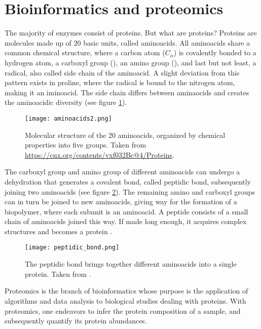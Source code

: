 \section{Bioinformatics and proteomics}

The majority of enzymes consist of proteins. But what are proteins? Proteins are molecules made up of 20 basic units, called aminoacids. All aminoacids share a common chemical structure, where a carbon atom ($C_\alpha$) is covalently bonded to a hydrogen atom, a carboxyl group (), an amino group (), and last but not least, a radical, also called side chain of the aminoacid. A slight deviation from this pattern exists in proline, where the radical is bound to the nitrogen atom, making it an iminoacid. The side chain differs between aminaocids and creates the aminoacidic diversity   (see figure \ref{fig:aminoacids}).

\begin{figure}
  \centering
  \texttt{[image: aminoacids2.png]}
  \caption[The 20 aminoacids]{Molecular structure of the 20 aminoacids, organized by chemical properties into five groups. Taken from \href{https://cnx.org/contents/vxf032Bc@4/Proteins}{https://cnx.org/contents/vxf032Bc@4/Proteins}.}
  \label{fig:aminoacids}
\end{figure}

The carboxyl group and amino group of different aminoacids can undergo a dehydration that generates a covalent bond, called peptidic bond, subsequently joining two aminoacids (see figure \ref{fig:peptidic_bond}). The remaining amino and carboxyl groups can in turn be joined to new aminoacids, giving way for the formation of a biopolymer, where each subunit is an aminoacid. A peptide consists of a small chain of aminoacids joined this way. If made long enough, it acquires complex structures and becomes a protein \cite{Nelson2008}.

\begin{figure}
  \centering
  \texttt{[image: peptidic\_bond.png]}
  \caption[The peptidic bond]{The peptidic bond brings together different aminoacids into a single protein. Taken from \cite{Nelson2008}.}
  \label{fig:peptidic_bond}
\end{figure}


Proteomics is the branch of bioinformatics whose purpose is the application of algorithms and data analysis to biological studies dealing with proteins. With proteomics, one endeavors to infer the protein composition of a sample, and subsequently quantify its protein abundances. 

